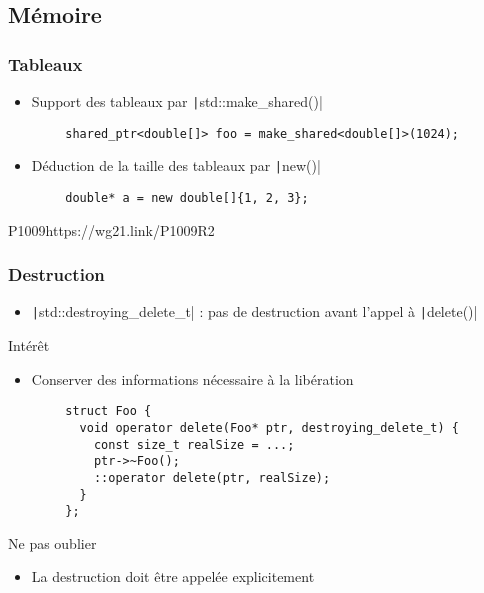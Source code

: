 \documentclass[C++.tex]{subfiles}
\begin{document}
\subsection*{Mémoire}
\begin{frame}[fragile]
	\frametitle{Tableaux}
	\begin{itemize}
		\item Support des tableaux par \texttt|std::make_shared()|
	\end{itemize}

	\begin{verbatim}
		shared_ptr<double[]> foo = make_shared<double[]>(1024);
	\end{verbatim}

	\begin{itemize}
		\item Déduction de la taille des tableaux par \texttt|new()|
	\end{itemize}

	\begin{verbatim}
		double* a = new double[]{1, 2, 3};
	\end{verbatim}

		{P1009}{https://wg21.link/P1009R2}
\end{frame}

\begin{frame}[fragile]
	\frametitle{Destruction}
	\begin{itemize}
		\item \texttt|std::destroying_delete_t| : pas de destruction avant l'appel à \texttt|delete()|
	\end{itemize}

	\begin{block}{Intérêt}
		\begin{itemize}
			\item Conserver des informations nécessaire à la libération
		\end{itemize}
	\end{block}

	\begin{verbatim}
		struct Foo {
		  void operator delete(Foo* ptr, destroying_delete_t) {
		    const size_t realSize = ...;
		    ptr->~Foo();
		    ::operator delete(ptr, realSize);
		  }
		};
	\end{verbatim}

	\begin{alertblock}{Ne pas oublier}
		\begin{itemize}
			\item La destruction doit être appelée explicitement
		\end{itemize}
	\end{alertblock}

\end{frame}
\end{document}
